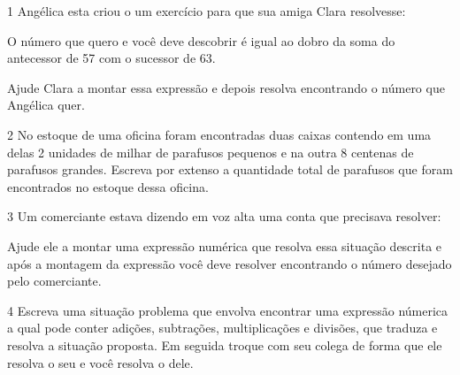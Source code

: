 
\num{1} Angélica esta criou o um exercício para que sua amiga Clara
resolvesse:

O número que quero e você deve descobrir é igual ao dobro da soma do
antecessor de 57 com o sucessor de 63.


Ajude Clara a montar essa expressão e depois resolva encontrando o
número que Angélica quer.



\num{2} No estoque de uma oficina foram encontradas duas caixas contendo em
uma delas 2 unidades de milhar de parafusos pequenos e na outra 8
centenas de parafusos grandes. Escreva por extenso a quantidade total de
parafusos que foram encontrados no estoque dessa oficina.



\num{3} Um comerciante estava dizendo em voz alta uma conta que precisava
resolver:


Ajude ele a montar uma expressão numérica que resolva essa situação
descrita e após a montagem da expressão você deve resolver encontrando o
número desejado pelo comerciante.



\num{4} Escreva uma situação problema que envolva encontrar uma expressão
númerica a qual pode conter adições, subtrações, multiplicações e
divisões, que traduza e resolva a situação proposta. Em seguida troque
com seu colega de forma que ele resolva o seu e você resolva o dele.



